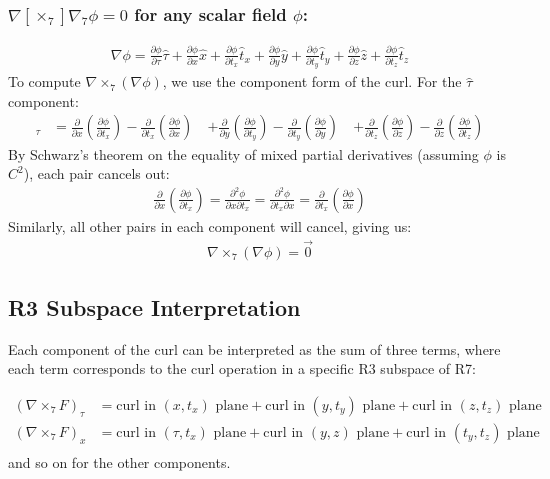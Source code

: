 \documentclass{article}
\begin{document}
\subsubsection*{$\nabla [\times_7] \nabla_7 \phi = 0$ for any scalar field $\phi$:}
\begin{align*}
\nabla \phi = \frac{\partial \phi}{\partial \tau}\hat{\tau} + \frac{\partial \phi}{\partial x}\hat{x} + \frac{\partial \phi}{\partial t_x}\hat{t}_x + \frac{\partial \phi}{\partial y}\hat{y} + \frac{\partial \phi}{\partial t_y}\hat{t}_y + \frac{\partial \phi}{\partial z}\hat{z} + \frac{\partial \phi}{\partial t_z}\hat{t}_z
\end{align*}
To compute $\nabla \times_7 (\nabla \phi)$, we use the component form of the curl. For the $\hat{\tau}$ component:
\begin{align*}
[\nabla \times_7 (\nabla \phi)]_\tau &= \frac{\partial}{\partial x}\left(\frac{\partial \phi}{\partial t_x}\right) - \frac{\partial}{\partial t_x}\left(\frac{\partial \phi}{\partial x}\right) \
&+ \frac{\partial}{\partial y}\left(\frac{\partial \phi}{\partial t_y}\right) - \frac{\partial}{\partial t_y}\left(\frac{\partial \phi}{\partial y}\right) \
&+ \frac{\partial}{\partial t_z}\left(\frac{\partial \phi}{\partial z}\right) - \frac{\partial}{\partial z}\left(\frac{\partial \phi}{\partial t_z}\right)
\end{align*}
By Schwarz's theorem on the equality of mixed partial derivatives (assuming $\phi$ is $C^2$), each pair cancels out:
\begin{align*}
\frac{\partial}{\partial x}\left(\frac{\partial \phi}{\partial t_x}\right) = \frac{\partial^2 \phi}{\partial x \partial t_x} = \frac{\partial^2 \phi}{\partial t_x \partial x} = \frac{\partial}{\partial t_x}\left(\frac{\partial \phi}{\partial x}\right)
\end{align*}
Similarly, all other pairs in each component will cancel, giving us:
\begin{align*}
\nabla \times_7 (\nabla \phi) = \vec{0}
\end{align*}

\subsection{R3 Subspace Interpretation}
Each component of the curl can be interpreted as the sum of three terms, where each term corresponds to the curl operation in a specific R3 subspace of R7:

\begin{align*}
(\nabla \times_{7} F)_\tau &= \text{curl in } (x,t_x) \text{ plane} + \text{curl in } (y,t_y) \text{ plane} + \text{curl in } (z,t_z) \text{ plane}\\
(\nabla \times_{7} F)_x &= \text{curl in } (\tau,t_x) \text{ plane} + \text{curl in } (y,z) \text{ plane} + \text{curl in } (t_y,t_z) \text{ plane}\\
\end{align*}
and so on for the other components.
\end{document}
